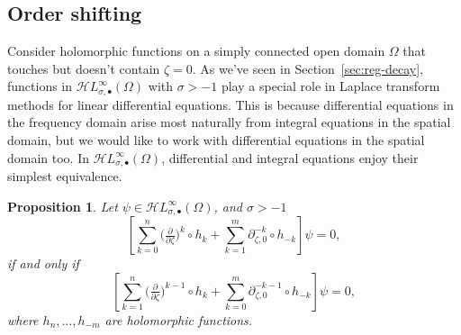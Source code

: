 \documentclass{article}
\newcommand{\singexp}[2]{\mathcal{H}L^\infty_{#1, #2}}
\newcommand{\singexpalg}[1]{\singexp{#1}{\bullet}}
\newcommand{\Z}{\mathbb{Z}}
\newcommand{\R}{\mathbb{R}}
\newcommand{\fracderiv}[3]{\partial^{#1}_{#2, #3}}
\theoremstyle{definition}
\theoremstyle{plain}
\newtheorem{prop}[definition]{Proposition}
\begin{document}
\subsection{Order shifting}\label{shifting}
Consider holomorphic functions on a simply connected open domain $\Omega$ that touches but doesn't contain $\zeta = 0$. %
As we've seen in Section~\ref{sec:reg-decay}, functions in $\singexpalg{\sigma}(\Omega)$ with $\sigma>-1$ play a special role in Laplace transform methods for linear differential equations. This is because differential equations in the frequency domain arise most naturally from integral equations in the spatial domain, but we would like to work with differential equations in the spatial domain too. In $\singexpalg{\sigma}(\Omega)$, differential and integral equations enjoy their simplest equivalence.
\begin{prop}\label{prop:shifting}
Let $\psi\in\singexpalg{\sigma}(\Omega)$, and $\sigma>-1$
\[ \left[ \sum_{k = 0}^n \big(\tfrac{\partial}{\partial \zeta}\big)^k \circ h_k + \sum_{k = 1}^m \fracderiv{-k}{\zeta}{0} \circ h_{-k} \right] \psi = 0, \]
if and only if
\[ \left[ \sum_{k = 1}^n \big(\tfrac{\partial}{\partial \zeta}\big)^{k-1} \circ h_k + \sum_{k = 0}^m \fracderiv{-k-1}{\zeta}{0} \circ h_{-k} \right] \psi = 0, \]
where $h_n, \ldots, h_{-m}$ are holomorphic functions.
\end{prop}

\end{document}

